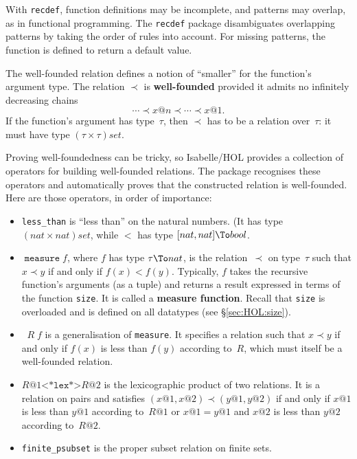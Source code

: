 With \texttt{recdef}, function definitions may be incomplete, and patterns may
overlap, as in functional programming.  The \texttt{recdef} package
disambiguates overlapping patterns by taking the order of rules into account.
For missing patterns, the function is defined to return a default value.


The well-founded relation defines a notion of ``smaller'' for the function's
argument type.  The relation $\prec$ is \textbf{well-founded} provided it
admits no infinitely decreasing chains
\[ \cdots\prec x@n\prec\cdots\prec x@1. \]
If the function's argument has type~$\tau$, then $\prec$ has to be a relation
over~$\tau$: it must have type $(\tau\times\tau)set$.

Proving well-foundedness can be tricky, so Isabelle/HOL provides a collection
of operators for building well-founded relations.  The package recognises
these operators and automatically proves that the constructed relation is
well-founded.  Here are those operators, in order of importance:
\begin{itemize}
\item \texttt{less_than} is ``less than'' on the natural numbers.
  (It has type $(nat\times nat)set$, while $<$ has type $[nat,nat]\To bool$.
  
\item $\mathop{\mathtt{measure}} f$, where $f$ has type $\tau\To nat$, is the
  relation~$\prec$ on type~$\tau$ such that $x\prec y$ if and only if
  $f(x)<f(y)$.  
  Typically, $f$ takes the recursive function's arguments (as a tuple) and
  returns a result expressed in terms of the function \texttt{size}.  It is
  called a \textbf{measure function}.  Recall that \texttt{size} is overloaded
  and is defined on all datatypes (see {\S}\ref{sec:HOL:size}).
                                                    
\item $\mathop{\mathtt{inv_image}} R\;f$ is a generalisation of
  \texttt{measure}.  It specifies a relation such that $x\prec y$ if and only
  if $f(x)$ 
  is less than $f(y)$ according to~$R$, which must itself be a well-founded
  relation.

\item $R@1\texttt{<*lex*>}R@2$ is the lexicographic product of two relations.
  It 
  is a relation on pairs and satisfies $(x@1,x@2)\prec(y@1,y@2)$ if and only
  if $x@1$ 
  is less than $y@1$ according to~$R@1$ or $x@1=y@1$ and $x@2$
  is less than $y@2$ according to~$R@2$.

\item \texttt{finite_psubset} is the proper subset relation on finite sets.
\end{itemize}

